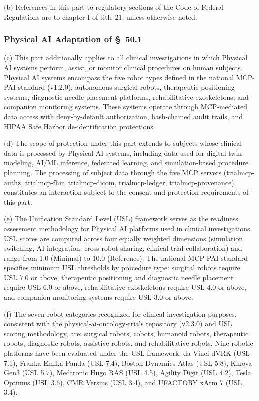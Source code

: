 \documentclass[11pt]{article}
\begin{document}
(b) References in this part to regulatory sections of the Code of Federal Regulations are to chapter I of title 21, unless otherwise noted.

\subsubsection{Physical AI Adaptation of \S~50.1}

(c) This part additionally applies to all clinical investigations in which Physical AI systems perform, assist, or monitor clinical procedures on human subjects. Physical AI systems encompass the five robot types defined in the national MCP-PAI standard (v1.2.0): autonomous surgical robots, therapeutic positioning systems, diagnostic needle-placement platforms, rehabilitative exoskeletons, and companion monitoring systems. These systems operate through MCP-mediated data access with deny-by-default authorization, hash-chained audit trails, and HIPAA Safe Harbor de-identification protections.

(d) The scope of protection under this part extends to subjects whose clinical data is processed by Physical AI systems, including data used for digital twin modeling, AI/ML inference, federated learning, and simulation-based procedure planning. The processing of subject data through the five MCP servers (trialmcp-authz, trialmcp-fhir, trialmcp-dicom, trialmcp-ledger, trialmcp-provenance) constitutes an interaction subject to the consent and protection requirements of this part.

(e) The Unification Standard Level (USL) framework serves as the readiness assessment methodology for Physical AI platforms used in clinical investigations. USL scores are computed across four equally weighted dimensions (simulation switching, AI integration, cross-robot sharing, clinical trial collaboration) and range from 1.0 (Minimal) to 10.0 (Reference). The national MCP-PAI standard specifies minimum USL thresholds by procedure type: surgical robots require USL 7.0 or above, therapeutic positioning and diagnostic needle placement require USL 6.0 or above, rehabilitative exoskeletons require USL 4.0 or above, and companion monitoring systems require USL 3.0 or above.

(f) The seven robot categories recognized for clinical investigation purposes, consistent with the physical-ai-oncology-trials repository (v2.3.0) and USL scoring methodology, are: surgical robots, cobots, humanoid robots, therapeutic robots, diagnostic robots, assistive robots, and rehabilitative robots. Nine robotic platforms have been evaluated under the USL framework: da Vinci dVRK (USL 7.1), Franka Emika Panda (USL 7.4), Boston Dynamics Atlas (USL 5.8), Kinova Gen3 (USL 5.7), Medtronic Hugo RAS (USL 4.5), Agility Digit (USL 4.2), Tesla Optimus (USL 3.6), CMR Versius (USL 3.4), and UFACTORY xArm 7 (USL 3.4).
\end{document}
